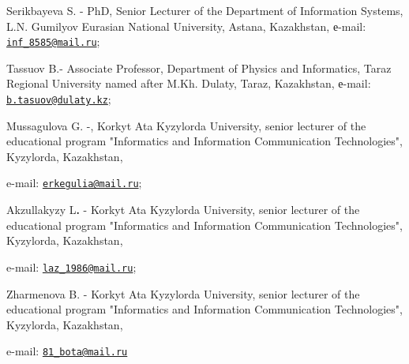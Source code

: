 Serikbayeva S. - PhD, Senior Lecturer of the Department of Information
Systems, L.N. Gumilyov Eurasian National University, Astana, Kazakhstan,
е-mail: \href{mailto:inf_8585@mail.ru}{\nolinkurl{inf\_8585@mail.ru}};

Tassuov B.- Associate Professor, Department of Physics and Informatics,
Taraz Regional University named after M.Kh. Dulaty, Taraz, Kazakhstan,
е-mail:
\href{mailto:b.tasuov@dulaty.kz}{\nolinkurl{b.tasuov@dulaty.kz}};

Mussagulova G. -, Korkyt Ata Kyzylorda University, senior lecturer of
the educational program "Informatics and Information Communication
Technologies", Kyzylorda, Kazakhstan,

e-mail: \href{mailto:erkegulia@mail.ru}{\nolinkurl{erkegulia@mail.ru}};

Akzullakyzy L{\bfseries .} - Korkyt Ata Kyzylorda University, senior
lecturer of the educational program "Informatics and Information
Communication Technologies", Kyzylorda, Kazakhstan,

e-mail: \href{mailto:laz_1986@mail.ru}{\nolinkurl{laz\_1986@mail.ru}};

Zharmenova B. - Korkyt Ata Kyzylorda University, senior lecturer of the
educational program "Informatics and Information Communication
Technologies", Kyzylorda, Kazakhstan,

e-mail: \href{mailto:81_bota@mail.ru}{\nolinkurl{81\_bota@mail.ru}}